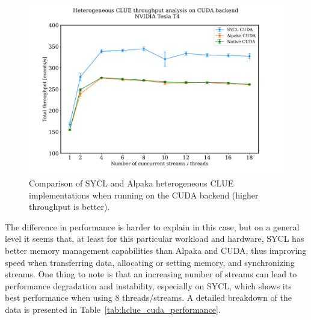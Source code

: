 \begin{figure}[H]
    \centering
    \includegraphics[width=\textwidth]{media/hclue_cuda_performance.jpg}
    \caption{Comparison of SYCL and Alpaka heterogeneous CLUE implementations when running on the CUDA backend (higher throughput is better).}
    \label{fig:hclue_cuda_performance}
\end{figure}
\noindent
The difference in performance is harder to explain in this case, but on a general level it seems that, at least for this particular workload and hardware, SYCL has better memory management capabilities than Alpaka and CUDA, thus improving speed when transferring data, allocating or setting memory, and synchronizing streams. One thing to note is that an increasing number of streams can lead to performance degradation and instability, especially on SYCL, which shows its best performance when using 8 threads/streams. A detailed breakdown of the data is presented in Table~\ref{tab:hclue_cuda_performance}.

